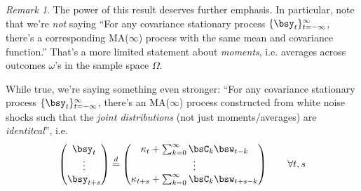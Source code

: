 \documentclass[12pt]{article}
\theoremstyle{plain}
\theoremstyle{definition}
\theoremstyle{remark}
\newtheorem*{rmk}{Remark}
\newcommand{\tinfinf}{_{t=-\infty}^\infty}
\begin{document}
\begin{rmk}
The power of this result deserves further emphasis.
In particular, note that we're \emph{not} saying ``For any covariance
stationary process $\{\bsy_t\}\tinfinf$, there's a corresponding
MA($\infty$) process with the same mean and covariance function.''
That's a more limited statement about \emph{moments}, i.e. averages
across outcomes $\omega$'s in the sample space $\Omega$.

While true, we're saying something even stronger: ``For any covariance
stationary process $\{\bsy_t\}\tinfinf$, there's an MA($\infty$) process
constructed from white noise shocks such that
the \emph{joint distributions} (not just moments/averages)
are \emph{identitcal}'', i.e.
\begin{align*}
  \begin{pmatrix}
    \bsy_t \\ \vdots \\ \bsy_{t+s}
  \end{pmatrix}
  \overset{d}{=}
  \begin{pmatrix}
    \kappa_t + \sum_{k=0}^\infty \bsC_k \bsw_{t-k}
    \\ \vdots \\
    \kappa_{t+s} + \sum_{k=0}^\infty \bsC_k \bsw_{t+s-k}
  \end{pmatrix}
  \qquad \forall t,s
\end{align*}
\end{rmk}
\end{document}
